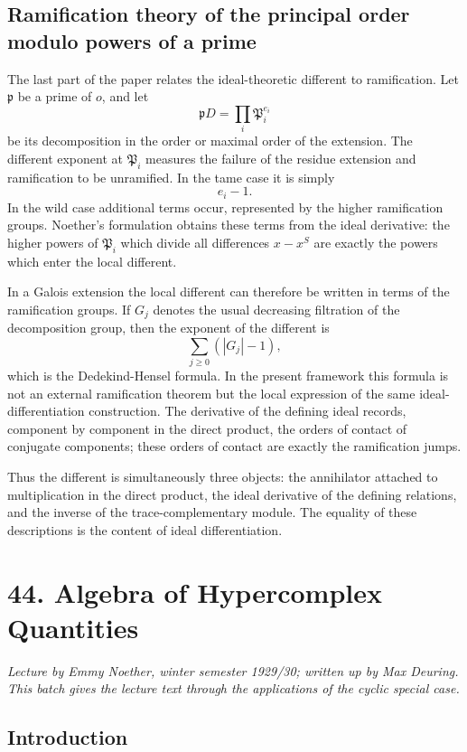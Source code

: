 \documentclass[12pt]{article}
\begin{document}
\subsection{Ramification theory of the principal order modulo powers of a prime}

The last part of the paper relates the ideal-theoretic different to ramification. Let \(\mathfrak p\) be a prime of \(o\), and let
\[
  \mathfrak pD=\prod_i \mathfrak P_i^{e_i}
\]
be its decomposition in the order or maximal order of the extension. The different exponent at \(\mathfrak P_i\) measures the failure of the residue extension and ramification to be unramified. In the tame case it is simply
\[
  e_i-1.
\]
In the wild case additional terms occur, represented by the higher ramification groups. Noether's formulation obtains these terms from the ideal derivative: the higher powers of \(\mathfrak P_i\) which divide all differences \(x-x^S\) are exactly the powers which enter the local different.

In a Galois extension the local different can therefore be written in terms of the ramification groups. If \(G_j\) denotes the usual decreasing filtration of the decomposition group, then the exponent of the different is
\[
  \sum_{j\ge0} (|G_j|-1),
\]
which is the Dedekind-Hensel formula. In the present framework this formula is not an external ramification theorem but the local expression of the same ideal-differentiation construction. The derivative of the defining ideal records, component by component in the direct product, the orders of contact of conjugate components; these orders of contact are exactly the ramification jumps.

Thus the different is simultaneously three objects: the annihilator attached to multiplication in the direct product, the ideal derivative of the defining relations, and the inverse of the trace-complementary module. The equality of these descriptions is the content of ideal differentiation.


\clearpage
\section{44. Algebra of Hypercomplex Quantities}

\textit{Lecture by Emmy Noether, winter semester 1929/30; written up by Max Deuring. This batch gives the lecture text through the applications of the cyclic special case.}

\subsection{Introduction}
\end{document}
